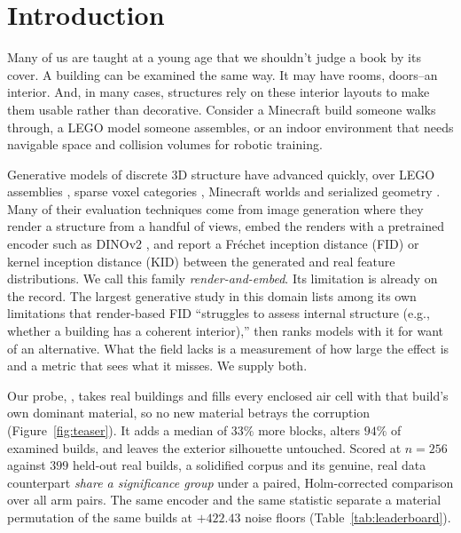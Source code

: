\section{Introduction}

Many of us are taught at a young age that we shouldn't judge a book by its cover. A building can be examined the same way. It may have rooms, doors--an interior. And, in many cases, structures rely on these interior layouts to make them usable rather than decorative. Consider a Minecraft build someone walks through, a LEGO model someone assembles, or an indoor environment that needs navigable space and collision volumes for robotic training.

Generative models of discrete {3D} structure have advanced quickly, over LEGO
assemblies \citep{pun2025brickgpt,legoace, kulits2026bricknet}, sparse voxel categories
\citep{jung2025scaffold}, Minecraft worlds \citep{merino2026dreamcubed} and
serialized geometry \citep{wang2024llamamesh,sudhakaran2023mariogpt}. Many of their evaluation techniques come from image generation where they render a structure from a handful of views, embed the renders with a pretrained encoder such as DINOv2 \citep{oquab2024dinov2}, and report a Fr\'echet inception distance (FID) \citep{heusel2017fid} or kernel inception distance (KID) \citep{binkowski2018kid} between the generated and real feature distributions. We call this family \emph{render-and-embed}. Its limitation is already on the record. The largest generative study in this domain \citep{merino2026dreamcubed} lists among its own limitations that render-based FID ``struggles to assess internal structure (e.g., whether a building has a coherent interior),'' then ranks models with it for want of an alternative. What the field lacks is a measurement of how large the effect is and a metric that sees what it misses. We supply both.


Our probe, \solidify{}, takes real buildings and fills every enclosed air cell with that build's own dominant material, so no new material betrays the corruption (Figure~\ref{fig:teaser}). It adds a median of $33\%$ more blocks, alters $94\%$ of examined builds, and leaves the exterior silhouette untouched. Scored at $n{=}256$ against $399$ held-out real builds, a solidified corpus and its genuine, real data counterpart \emph{share a significance group} under a paired,  Holm-corrected \citep{holm1979simple} comparison over all arm pairs. The same encoder and the same statistic separate a material permutation of the same builds at $+422.43$ noise floors (Table~\ref{tab:leaderboard}).

